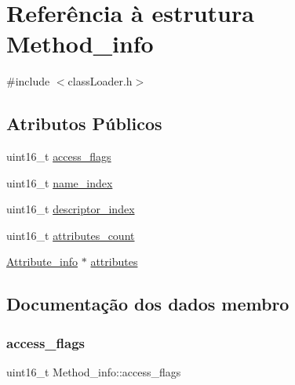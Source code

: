 \hypertarget{struct_method__info}{}\section{Referência à estrutura Method\+\_\+info}
\label{struct_method__info}


{\ttfamily \#include $<$class\+Loader.\+h$>$}

\subsection*{Atributos Públicos}
\begin{DoxyCompactItemize}
\item 
uint16\+\_\+t \hyperlink{struct_method__info_a6d6c8c25f4bdb42b77b6a8ac6250398b}{access\+\_\+flags}
\item 
uint16\+\_\+t \hyperlink{struct_method__info_ad1f067bfd8d2d231f598824676dc7851}{name\+\_\+index}
\item 
uint16\+\_\+t \hyperlink{struct_method__info_af713175c97f681296e801e0c11e0ae34}{descriptor\+\_\+index}
\item 
uint16\+\_\+t \hyperlink{struct_method__info_afd638bcc6f20cfa8dd1de8741c8b5493}{attributes\+\_\+count}
\item 
\hyperlink{struct_attribute__info}{Attribute\+\_\+info} $\ast$ \hyperlink{struct_method__info_a56fbb565dcff2992d66f57b29774c322}{attributes}
\end{DoxyCompactItemize}


\subsection{Documentação dos dados membro}
\hypertarget{struct_method__info_a6d6c8c25f4bdb42b77b6a8ac6250398b}{}\label{struct_method__info_a6d6c8c25f4bdb42b77b6a8ac6250398b} 
\subsubsection{\texorpdfstring{access\+\_\+flags}{access\_flags}}
{\footnotesize\ttfamily uint16\+\_\+t Method\+\_\+info\+::access\+\_\+flags}

\hypertarget{struct_method__info_a56fbb565dcff2992d66f57b29774c322}{}\label{struct_method__info_a56fbb565dcff2992d66f57b29774c322} 
